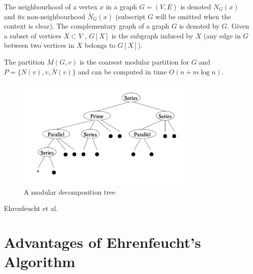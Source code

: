 The neighbourhood of a vertex $x$ in a graph $G = (V, E)$ is denoted $N_G(x)$ and its non-neighbourhood $\bar{N}_G(x)$ (subscript $G$ will be omitted when the context is clear).
The complementary graph of a graph $G$ is denoted by $G$.
Given a subset of vertices $X \subset V$ , $G[X]$ is the subgraph induced by $X$ (any edge in $G$ between two vertices in $X$ belongs to $G[X]$).

\begin{mylem}
    The partition $M(G, v)$ is the coarsest modular partition for $G$ and $P = \{N(v), v, \bar{N}(v)\}$ and can be computed in time $O(n + m \log n)$.
\end{mylem}

\begin{figure}[!h]
    \centering
    \includegraphics[width=0.80\textwidth]{images/graphs/modular-decomposition-tree}
    \caption{A modular decomposition tree}
    \label{fig:example-modular-decomposition-tree}
\end{figure}

\begin{algorithm}[H]
    \caption{Ehrenfeucht et al. \cite{SAMD}\cite{PTDMD}} %
    \label{alg:algorithm-Ehrenfeucht-et-al}
\end{algorithm}


\section{Advantages of Ehrenfeucht's Algorithm}\label{sec:advantages-of-ehrenfeucht's-algorithm}

